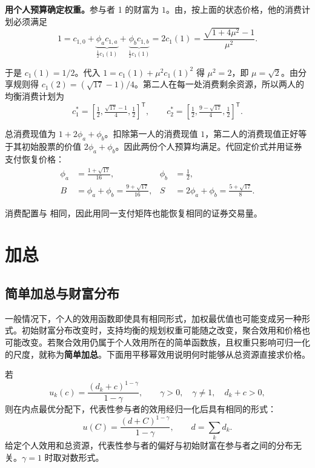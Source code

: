 \begin{tcolorbox}[example]
\begin{solution}[blank-type=manual,blank-vsep=7\baselineskip]
\textbf{用个人预算确定权重。}参与者 1 的财富为 $1$。由，按上面的状态价格，他的消费计划必须满足
\[
 1=c_{1,0}+\underbrace{\phi_a c_{1,a}}_{\tfrac12 c_1(1)}
           +\underbrace{\phi_b c_{1,b}}_{\tfrac12 c_1(1)}
   =2c_1(1)=\frac{\sqrt{1+4\mu^2}-1}{\mu^2}.
\]

于是 $c_1(1)=1/2$。代入 $1=c_1(1)+\mu^2c_1(1)^2$ 得 $\mu^2=2$，即 $\mu=\sqrt{2}$。由分享规则得 $c_1(2)=(\sqrt{17}-1)/4$。第二人在每一处消费剩余资源，所以两人的均衡消费计划为
\[
 c_1^*=\left[\tfrac12,\tfrac{\sqrt{17}-1}{4},\tfrac12\right]^{\mathsf T},
 \qquad
 c_2^*=\left[\tfrac12,\tfrac{9-\sqrt{17}}4,\tfrac12\right]^{\mathsf T}.
\]

总消费现值为 $1+2\phi_a+\phi_b$。扣除第一人的消费现值 $1$，第二人的消费现值正好等于其初始股票的价值 $2\phi_a+\phi_b$。因此两份个人预算均满足。代回定价式并用证券支付恢复价格：
\[
 \begin{aligned}
 \phi_a&=\frac{1+\sqrt{17}}{16}, & \phi_b&=\frac12,\\
 B&=\phi_a+\phi_b=\frac{9+\sqrt{17}}{16},&
 S&=2\phi_a+\phi_b=\frac{5+\sqrt{17}}8.
 \end{aligned}
\]

消费配置与 相同，因此用同一支付矩阵也能恢复相同的证券交易量。
\end{solution}
\end{tcolorbox}

\section{加总}\label{sec:wj-ten-4}
\subsection{简单加总与财富分布}
一般情况下，个人的效用函数即使具有相同形式，加权最优值也可能变成另一种形式。初始财富分布改变时，支持均衡的规划权重可能随之改变，聚合效用和价格也可能改变。若聚合效用仍属于个人效用所在的简单函数族，且权重只影响可归一化的尺度，就称为\textbf{简单加总}。下面用平移幂效用说明何时能够从总资源直接求价格。
\begin{tcolorbox}[knowledge]
 若
\[
 u_k(c)=\frac{(d_k+c)^{1-\gamma}}{1-\gamma},\qquad
 \gamma>0,\quad\gamma\ne1,\quad d_k+c>0,
\]
则在内点最优分配下，代表性参与者的效用经归一化后具有相同的形式：
\[
 u(C)=\frac{(d+C)^{1-\gamma}}{1-\gamma},\qquad d=\sum_kd_k.
\]
给定个人效用和总资源，代表性参与者的偏好与初始财富在参与者之间的分布无关。$\gamma=1$ 时取对数形式。
\end{tcolorbox}

